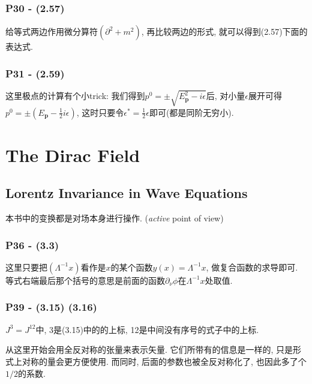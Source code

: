 \documentclass[cn,hazy,blue,11pt,device=normal,chinesefont=founder]{elegantnote}
\begin{document}
\subsubsection{P30 - (2.57)}

给等式两边作用微分算符$(\partial^2 + m^2)$, 再比较两边的形式, 就可以得到(2.57)下面的表达式. 

\subsubsection{P31 - (2.59)}

这里极点的计算有个小trick: 我们得到$p^0 = \pm\sqrt{E_\mathbf{p}^2 - i\epsilon}$后, 对小量$\epsilon$展开可得$p^0 = \pm (E_\mathbf{p} - \frac{1}{2}i\epsilon)$, 这时只要令$\epsilon^* = \frac{1}{2}\epsilon$即可(都是同阶无穷小). 

\clearpage

\section{The Dirac Field}

\subsection{Lorentz Invariance in Wave Equations}

\begin{note}
  本书中的变换都是对场本身进行操作. (\textit{active} point of view)
\end{note}

\subsubsection{P36 - (3.3)}

这里只要把$(\Lambda^{-1}x)$看作是$x$的某个函数$y(x) = \Lambda^{-1}x$, 做复合函数的求导即可. 等式右端最后那个括号的意思是前面的函数$\partial_{\nu}\phi$在$\Lambda^{-1}x$处取值. 

\subsubsection{P39 - (3.15) (3.16)}

$J^3 = J^{12}$中, 3是(3.15)中的的上标, 12是中间没有序号的式子中的上标. 

从这里开始会用全反对称的张量来表示矢量. 它们所带有的信息是一样的, 只是形式上对称的量会更方便使用. 而同时, 后面的参数也被全反对称化了, 也因此多了个$1/2$的系数. 
\end{document}
